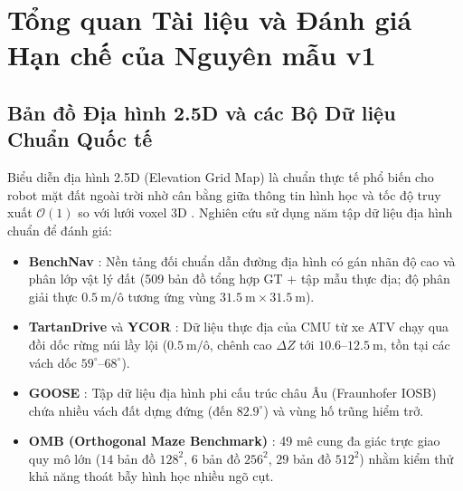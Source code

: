 \documentclass[12pt, a4paper]{article}
\begin{document}
\section{Tổng quan Tài liệu và Đánh giá Hạn chế của Nguyên mẫu v1}

\subsection{Bản đồ Địa hình 2.5D và các Bộ Dữ liệu Chuẩn Quốc tế}
Biểu diễn địa hình 2.5D (Elevation Grid Map) là chuẩn thực tế phổ biến cho robot mặt đất ngoài trời nhờ cân bằng giữa thông tin hình học và tốc độ truy xuất $\mathcal{O}(1)$ so với lưới voxel 3D \cite{triebel2006, miki2022elevation}. Nghiên cứu sử dụng năm tập dữ liệu địa hình chuẩn để đánh giá:
\begin{itemize}
    \item \textbf{BenchNav} \cite{endo2024}: Nền tảng đối chuẩn dẫn đường địa hình có gán nhãn độ cao và phân lớp vật lý đất (509 bản đồ tổng hợp GT + tập mẫu thực địa; độ phân giải thực $0.5\ \text{m/ô}$ tương ứng vùng $31.5\ \text{m}\times 31.5\ \text{m}$).
    \item \textbf{TartanDrive} \cite{triest2022tartandrive} và \textbf{YCOR} \cite{maturana2018ycor}: Dữ liệu thực địa của CMU từ xe ATV chạy qua đồi dốc rừng núi lầy lội ($0.5\ \text{m/ô}$, chênh cao $\Delta Z$ tới $10.6\text{--}12.5\ \text{m}$, tồn tại các vách dốc $59^\circ\text{--}68^\circ$).
    \item \textbf{GOOSE} \cite{mortimer2024goose}: Tập dữ liệu địa hình phi cấu trúc châu Âu (Fraunhofer IOSB) chứa nhiều vách đất dựng đứng (đến $82.9^\circ$) và vùng hố trũng hiểm trở.
    \item \textbf{OMB (Orthogonal Maze Benchmark)} \cite{linh2026dataset}: 49 mê cung đa giác trực giao quy mô lớn ($14$ bản đồ $128^2$, $6$ bản đồ $256^2$, $29$ bản đồ $512^2$) nhằm kiểm thử khả năng thoát bẫy hình học nhiều ngõ cụt.
\end{itemize}
\end{document}
